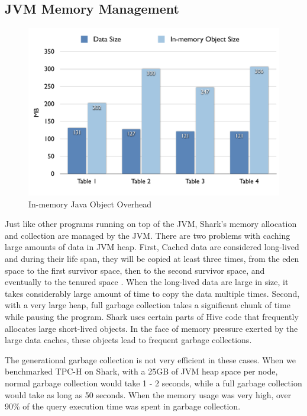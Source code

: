 \subsection{JVM Memory Management}

\begin{figure}
	\centering
	\includegraphics[width=\linewidth]{files/object-overhead.pdf}
	\caption{In-memory Java Object Overhead}
\end{figure}

Just like other programs running on top of the JVM, Shark's memory allocation and collection are managed by the JVM. There are two problems with caching large amounts of data in JVM heap. First, Cached data are considered long-lived and during their life span, they will be copied at least three times, from the eden space to the first survivor space, then to the second survivor space, and eventually to the tenured space \cite{jvm-gc}. When the long-lived data are large in size, it takes considerably large amount of time to copy the data multiple times. Second, with a very large heap, full garbage collection takes a significant chunk of time while pausing the program. Shark uses certain parts of Hive code that frequently allocates large short-lived objects. In the face of memory pressure exerted by the large data caches, these objects lead to frequent garbage collections.

The generational garbage collection is not very efficient in these cases. When we benchmarked TPC-H on Shark, with a 25GB of JVM heap space per node, normal garbage collection would take 1 - 2 seconds, while a full garbage collection would take as long as 50 seconds. When the memory usage was very high, over 90\% of the query execution time was spent in garbage collection.

